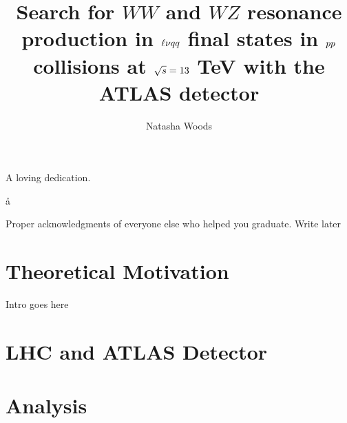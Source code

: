





\title{Search for $WW$ and $WZ$ resonance production in $\ell\nu \MakeLowercase{qq}$ final states in $\MakeLowercase{pp}$ collisions at $\sqrt{\MakeLowercase{s}}=13$ TeV with the ATLAS detector}
\author{Natasha Woods}
\deanlinethree{}

\begin{frontmatter}
\maketitle

\copyrightpage

\tableofcontents


\listoffigures

\listoftables
\begin{abstract}

\end{abstract}

\begin{dedication}
\vspace*{\fill}
\begin{center}
A loving dedication.
\end{center}
\vspace*{\fill}å
\end{dedication}

\begin{acknowledgements}
Proper acknowledgments of everyone else who helped you graduate. Write later
\end{acknowledgements}

\end{frontmatter}
\linenumbers

\chapter{Theoretical Motivation}
Intro goes here


\chapter{LHC and ATLAS Detector}


\chapter{Analysis}


